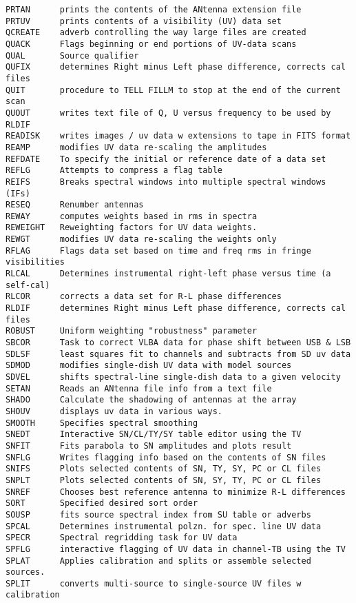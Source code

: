 \begin{verbatim}
PRTAN      prints the contents of the ANtenna extension file
PRTUV      prints contents of a visibility (UV) data set
QCREATE    adverb controlling the way large files are created
QUACK      Flags beginning or end portions of UV-data scans
QUAL       Source qualifier
QUFIX      determines Right minus Left phase difference, corrects cal files
QUIT       procedure to TELL FILLM to stop at the end of the current scan
QUOUT      writes text file of Q, U versus frequency to be used by RLDIF
READISK    writes images / uv data w extensions to tape in FITS format
REAMP      modifies UV data re-scaling the amplitudes
REFDATE    To specify the initial or reference date of a data set
REFLG      Attempts to compress a flag table
REIFS      Breaks spectral windows into multiple spectral windows (IFs)
RESEQ      Renumber antennas
REWAY      computes weights based in rms in spectra
REWEIGHT   Reweighting factors for UV data weights.
REWGT      modifies UV data re-scaling the weights only
RFLAG      Flags data set based on time and freq rms in fringe visibilities
RLCAL      Determines instrumental right-left phase versus time (a self-cal)
RLCOR      corrects a data set for R-L phase differences
RLDIF      determines Right minus Left phase difference, corrects cal files
ROBUST     Uniform weighting "robustness" parameter
SBCOR      Task to correct VLBA data for phase shift between USB & LSB
SDLSF      least squares fit to channels and subtracts from SD uv data
SDMOD      modifies single-dish UV data with model sources
SDVEL      shifts spectral-line single-dish data to a given velocity
SETAN      Reads an ANtenna file info from a text file
SHADO      Calculate the shadowing of antennas at the array
SHOUV      displays uv data in various ways.
SMOOTH     Specifies spectral smoothing
SNEDT      Interactive SN/CL/TY/SY table editor using the TV
SNFIT      Fits parabola to SN amplitudes and plots result
SNFLG      Writes flagging info based on the contents of SN files
SNIFS      Plots selected contents of SN, TY, SY, PC or CL files
SNPLT      Plots selected contents of SN, SY, TY, PC or CL files
SNREF      Chooses best reference antenna to minimize R-L differences
SORT       Specified desired sort order
SOUSP      fits source spectral index from SU table or adverbs
SPCAL      Determines instrumental polzn. for spec. line UV data
SPECR      Spectral regridding task for UV data
SPFLG      interactive flagging of UV data in channel-TB using the TV
SPLAT      Applies calibration and splits or assemble selected sources.
SPLIT      converts multi-source to single-source UV files w calibration

\end{verbatim}
